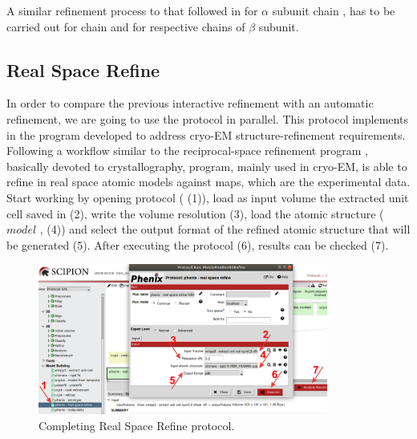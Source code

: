 A similar refinement process to that followed in \coot for  $\alpha$ subunit chain , has to be carried out for chain  and for respective chains of  $\beta$ subunit.\\
 
 
 \subsection*{\phenix Real Space Refine}
 
 In order to compare the previous \coot interactive refinement with an automatic refinement, we are going to use the
  protocol in parallel. This protocol implements in \scipion the  program developed to address cryo-EM structure-refinement requirements. Following a workflow similar to the \phenix reciprocal-space refinement program , basically devoted to crystallography,  program, mainly used in cryo-EM, is able to refine in real space atomic models against maps, which are the experimental data.\\
 
 Start working by opening  protocol ( (1)), load as input volume the extracted unit cell saved in \coot (2), write the volume resolution (3), load the atomic structure ($model$ , (4)) and select the output format of the refined atomic structure that will be generated (5). After executing the protocol (6), results can be checked (7). 
 
 \begin{figure}[H]
  \centering 
  \captionsetup{width=.7\linewidth} 
  \includegraphics[width=0.85\textwidth]{Images/Fig29}
  \caption{Completing \phenix Real Space Refine protocol.}
  \label{fig:phenix_real_space_refine_protocol}
  \end{figure}
 
